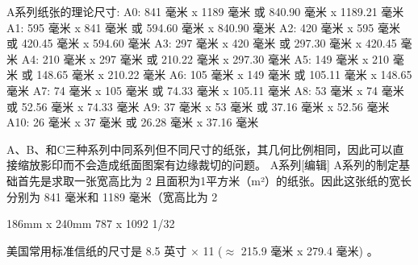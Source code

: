\documentclass[main.tex]{subfiles}
\begin{document}
A系列纸张的理论尺寸:
A0: 841 毫米 x 1189 毫米   或  840.90 毫米 x 1189.21 毫米
A1: 595 毫米 x  841 毫米   或  594.60 毫米 x  840.90 毫米
A2: 420 毫米 x  595 毫米   或  420.45 毫米 x  594.60 毫米
A3: 297 毫米 x  420 毫米   或  297.30 毫米 x  420.45 毫米
A4: 210 毫米 x  297 毫米   或  210.22 毫米 x  297.30 毫米
A5: 149 毫米 x  210 毫米   或  148.65 毫米 x  210.22 毫米
A6: 105 毫米 x  149 毫米   或  105.11 毫米 x  148.65 毫米
A7:  74 毫米 x  105 毫米   或   74.33 毫米 x  105.11 毫米
A8:  53 毫米 x   74 毫米   或   52.56 毫米 x   74.33 毫米
A9:  37 毫米 x   53 毫米   或   37.16 毫米 x   52.56 毫米
A10:  26 毫米 x   37 毫米   或   26.28 毫米 x   37.16 毫米

A、B、和C三种系列中同系列但不同尺寸的纸张，其几何比例相同，因此可以直接缩放影印而不会造成纸面图案有边缘裁切的问题。
A系列[编辑]
A系列的制定基础首先是求取一张宽高比为
2
且面积为1平方米（m²）的纸张。因此这张纸的宽长分别为 841 毫米和 1189 毫米（宽高比为
2



186mm x 240mm
787 x 1092 1/32 


美国常用标准信纸的尺寸是 8.5 英寸 × 11 ($\approx$ 215.9 毫米 x 279.4 毫米) 。
\newpage
\end{document}

